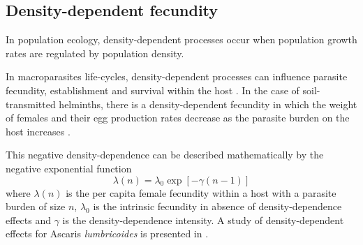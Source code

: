 \documentclass[bimj,fleqn]{w-art}
\theoremstyle{plain}
\theoremstyle{definition}
\begin{document}
\subsection{Density-dependent fecundity}
In population ecology, density-dependent processes occur when population growth rates are regulated by population density.

In macroparasites life-cycles, density-dependent processes can influence parasite fecundity, establishment and survival within the host .  In the case of soil-transmitted helminths, there is a density-dependent fecundity in which the weight of females and their egg production rates decrease as the parasite burden on the host increases \cite{churcher2006density,walker2009density}.

This negative density-dependence can be described mathematically by the negative exponential function
\begin{equation}
\lambda(n)=\lambda_0 \exp[-\gamma(n-1)]
\end{equation} 
where $\lambda(n)$ is the per capita female fecundity within a host with a parasite burden of size $n$,
$\lambda_0$ is the intrinsic fecundity in absence of density-dependence effects and 
$\gamma$ is the density-dependence intensity. 
A study  of density-dependent effects for Ascaris \textit{lumbricoides} is presented in \cite{hall2000geographical}.
\end{document}

